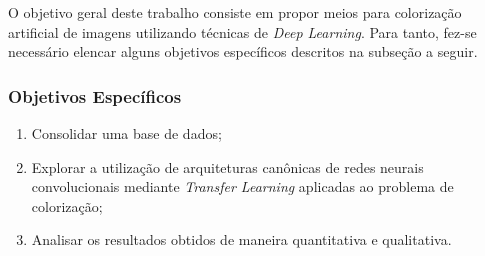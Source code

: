 O objetivo geral deste trabalho consiste em propor meios para colorização artificial de imagens utilizando técnicas de \textit{Deep Learning}. Para tanto, fez-se necessário elencar alguns objetivos específicos descritos na subseção a seguir.

\subsubsection{Objetivos Específicos} \label{subsubsec:especificos}

\begin{enumerate}
	\item Consolidar uma base de dados;
	\item Explorar a utilização de arquiteturas canônicas de redes neurais convolucionais mediante \textit{Transfer Learning} aplicadas ao problema de colorização;
	\item Analisar os resultados obtidos de maneira quantitativa e qualitativa.
\end{enumerate}
